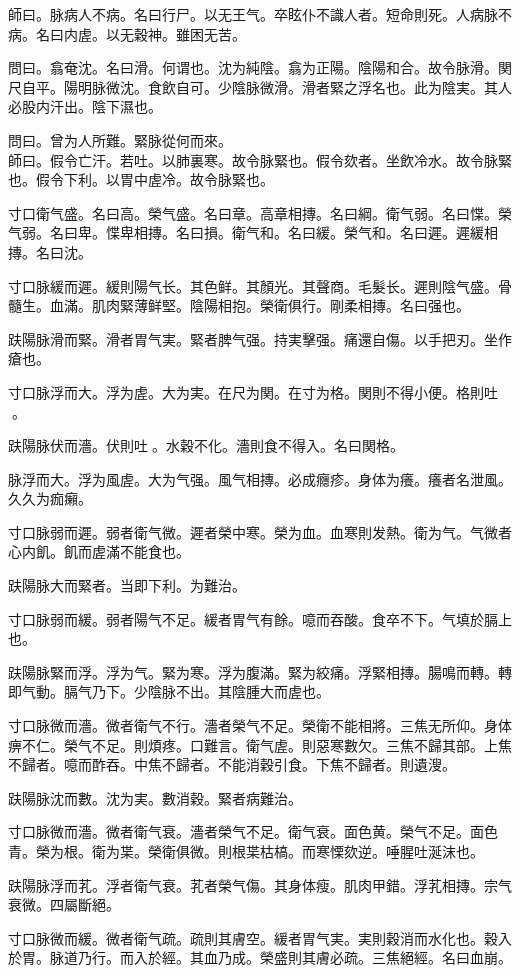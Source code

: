 師曰。脉病人不病。名曰行尸。以无王气。卒眩仆不識人者。短命則死。人病脉不病。名曰内虗。以无穀神。雖困无苦。

問曰。翕奄沈。名曰滑。何谓也。沈为純陰。翕为正陽。陰陽和合。故令脉滑。関尺自平。陽明脉微沈。食飲自可。少陰脉微滑。滑者緊之浮名也。此为陰実。其人必股内汗出。陰下濕也。

問曰。曾为人所難。緊脉從何而來。\\
師曰。假令亡汗。若吐。以肺裏寒。故令脉緊也。假令欬者。坐飲冷水。故令脉緊也。假令下利。以胃中虗冷。故令脉緊也。

寸口衛气盛。名曰高。榮气盛。名曰章。高章相摶。名曰綱。衛气弱。名曰惵。榮气弱。名曰卑。惵卑相摶。名曰損。衛气和。名曰緩。榮气和。名曰遲。遲緩相摶。名曰沈。

寸口脉緩而遲。緩則陽气长。其色鲜。其顏光。其聲商。毛髮长。遲則陰气盛。骨髓生。血滿。肌肉緊薄鲜堅。陰陽相抱。榮衛俱行。剛柔相摶。名曰强也。

趺陽脉滑而緊。滑者胃气実。緊者脾气强。持実擊强。痛還自傷。以手把刃。坐作瘡也。

寸口脉浮而大。浮为虗。大为実。在尺为関。在寸为格。関則不得小便。格則吐{\sungtpii 𠱘}。

趺陽脉伏而濇。伏則吐{\sungtpii 𠱘}。水穀不化。濇則食不得入。名曰関格。

脉浮而大。浮为風虗。大为气强。風气相摶。必成癮疹。身体为癢。癢者名泄風。久久为痂癩。

寸口脉弱而遲。弱者衛气微。遲者榮中寒。榮为血。血寒則发熱。衛为气。气微者心内飢。飢而虗滿不能食也。

趺陽脉大而緊者。当即下利。为難治。

寸口脉弱而緩。弱者陽气不足。緩者胃气有餘。噫而吞酸。食卒不下。气填於膈上也。

趺陽脉緊而浮。浮为气。緊为寒。浮为腹滿。緊为絞痛。浮緊相摶。腸鳴而轉。轉即气動。膈气乃下。少陰脉不出。其陰腫大而虗也。

寸口脉微而濇。微者衛气不行。濇者榮气不足。榮衛不能相將。三焦无所仰。身体痹不仁。榮气不足。則煩疼。口難言。衛气虗。則惡寒數欠。三焦不歸其部。上焦不歸者。噫而酢吞。中焦不歸者。不能消穀引食。下焦不歸者。則遺溲。

趺陽脉沈而數。沈为実。數消穀。緊者病難治。

寸口脉微而濇。微者衛气衰。濇者榮气不足。衛气衰。面色黄。榮气不足。面色青。榮为根。衛为枼。榮衛俱微。則根枼枯槁。而寒慄欬逆。唾腥吐涎沫也。

趺陽脉浮而芤。浮者衛气衰。芤者榮气傷。其身体瘦。肌肉甲錯。浮芤相摶。宗气衰微。四屬斷絕。

寸口脉微而緩。微者衛气疏。疏則其膚空。緩者胃气実。実則穀消而水化也。穀入於胃。脉道乃行。而入於經。其血乃成。榮盛則其膚必疏。三焦絕經。名曰血崩。

